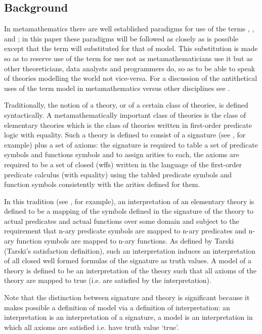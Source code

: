 \subsection{Background}
\note  In metamathematics there are well established paradigms for use of the terms
, ,  and ;
in this paper  these paradigms will be followed as closely as is possible except that the term  will substituted  for that of model. 
This substitution is made so as to reserve use of the term  for  use not as metamathematicians 
use it but as other theoreticians, data analysts and programmers do, so as to be able to speak of theories modelling 
the world not vice-versa. For a discussion of the antithetical uses of the term model in metamathematics versus other disciplines see \cite{HodgesModelTheory}.

Traditionally, the notion of a theory, or of a certain class of theories, is  defined syntactically.
A metamathematically important class of theories  is the class of elementary theories 
which is the class of theories written in first-order predicate logic with equality. 
Such a theory is defined to consist of a signature (see \cite{HodgesModelTheory}, for example) plus a set of axioms: 
the signature is required to table a set of predicate symbols and functions symbols and to assign arities to each, 
the axioms are required  to be a set of closed  (wffs) written
in the language of the first-order predicate calculus (with equality)
using the tabled predicate symbols and function symbols consistently with the arities defined for them. 

\note In this tradition (see \cite{Mendelson}, for example), an interpretation of an elementary theory is defined to be a mapping of the symbols defined in the signature 
of the theory to actual predicates and actual functions over some domain and subject to the requirement that n-ary predicate symbols are mapped to n-ary predicates and n-ary function symbols are mapped to n-ary functions.
As defined by Tarski (Tarski's satisfaction definition), 
such an interpretation induces an interpretation of all
closed well formed formulas of the signature as truth values. 
A model of a theory is defined to be an interpretation of the theory such that all axioms of the theory are mapped to true (i.e. are satisfied by the interpretation). 

\note
Note that the distinction between signature and theory is significant because it makes possible a definition of model 
via a definition of interpretation: an interpretation is an interpretation of a signature, 
a model is an interpretation in which all axioms are satisfied i.e. have truth value `true'.   


